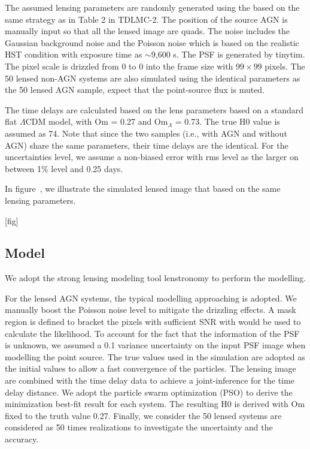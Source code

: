 \documentclass[useAMS,usenatbib,usegraphicx]{mn2e}
\begin{document}
The assumed lensing parameters are randomly generated using the based on the same strategy as in Table 2 in TDLMC-2. The position of the source AGN is manually input so that all the lensed image are quads. The noise includes the Gaussian background noise and the Poisson noise which is based on the realistic HST condition with exposure time as $\sim$9,600 s. The PSF is generated by tinytim. The pixel scale is drizzled from 0 to 0 into the frame size with $99\times99$ pixels. The 50 lensed non-AGN systems are also simulated using the identical parameters as the 50 lensed AGN sample, expect that the point-source flux is muted. 

The time delays are calculated based on the lens parameters based on a standard flat $\Lambda$CDM model, with Om = 0.27 and Om$_\Lambda$ = 0.73. The true H0 value is assumed as 74. Note that since the two samples (i.e., with AGN and without AGN) share the same parameters, their time delays are the identical. For the uncertainties level, we assume a non-biased error with rms level as the larger on between 1\% level and 0.25 days.

In figure~, we illustrate the simulated lensed image that based on the same lensing parameters.

[fig]

\subsection{Model }
We adopt the strong lensing modeling tool lenstronomy to perform the modelling.

For the lensed AGN systems, the typical modelling approaching is adopted. We manually boost the Poisson noise level to mitigate the drizzling effects. A mask region is defined to bracket the pixels with sufficient SNR with would be used to calculate the likelihood. To account for the fact that the information of the PSF is unknown, we assumed a 0.1 variance uncertainty on the input PSF image when modelling the point source. The true values used in the simulation are adopted as the initial values to allow a fast convergence of the particles. The lensing image are combined with the time delay data to achieve a joint-inference for the time delay distance. We adopt the particle swarm optimization (PSO) to derive the minimization best-fit result for each system. The resulting H0 is derived with Om fixed to the truth value 0.27.
Finally, we consider the 50 lensed systems are considered as 50 times realizations to investigate the uncertainty and the accuracy.
\end{document}
